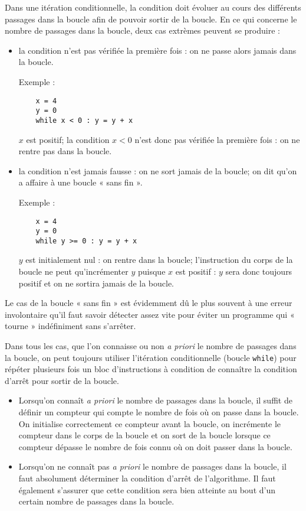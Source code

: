 Dans une itération conditionnelle, la condition doit évoluer au cours des différents passages
dans la boucle afin de pouvoir sortir de la boucle. 
En ce qui concerne le nombre de passages dans la boucle, deux cas extrèmes peuvent se produire : 
\begin{itemize}
\item la condition n'est pas vérifiée la première fois : 
	on ne passe alors jamais dans la boucle.
	
	Exemple : 
	\begin{minipage}[t]{5cm}
	\begin{Verbatim}
	x = 4
	y = 0
	while x < 0 : y = y + x
	\end{Verbatim}
	\end{minipage}\hfill
	\begin{minipage}[t]{7.5cm}\footnotesize
	$x$ est positif; la condition $x < 0$ n'est donc pas vérifiée la première
	fois : on ne rentre pas dans la boucle.
	\end{minipage}
\item la condition n'est jamais fausse : on ne sort jamais de la boucle; 
	on dit qu'on a affaire à une boucle « sans fin ».

	Exemple : 
	\begin{minipage}[t]{5cm}
	\begin{Verbatim}
	x = 4
	y = 0
	while y >= 0 : y = y + x
	\end{Verbatim}
	\end{minipage}\hfill
	\begin{minipage}[t]{7.5cm}\footnotesize
	$y$ est initialement nul : on rentre dans la boucle;
	l'instruction du corps de la boucle ne peut qu'incrémenter $y$
	puisque $x$ est positif : $y$ sera donc toujours positif et on 
	ne sortira jamais de la boucle.
	\end{minipage}
\end{itemize}
Le cas de la boucle « sans fin » est évidemment dû le plus souvent à une erreur involontaire
qu'il faut savoir détecter assez vite pour éviter un programme qui « tourne » indéfiniment
sans s'arrêter.

Dans tous les cas, que l'on connaisse ou non {\em a priori} le nombre de passages dans la boucle, on peut
toujours utiliser l'itération conditionnelle (boucle {\tt while}) pour répéter plusieurs fois un bloc
d'instructions à condition de connaître la condition d'arrêt pour sortir de la boucle.
\begin{itemize}
\item Lorsqu'on connaît {\em a priori} le nombre de passages dans la boucle, 
	il suffit de définir un compteur qui compte le nombre
	de fois où on passe dans la boucle.
	On initialise correctement ce compteur avant la boucle, 
	on incrémente le compteur dans le corps de la boucle
	et on sort de la boucle lorsque ce compteur dépasse le nombre de fois connu
	où on doit passer dans la boucle.
\item Lorsqu'on ne connaît pas {\em a priori} le nombre de passages dans la boucle, 
	il faut absolument déterminer la condition d'arrêt
	de l'algorithme.
	Il faut également s'assurer que cette condition sera bien atteinte au bout d'un certain 
	nombre de passages dans la boucle.
\end{itemize}


